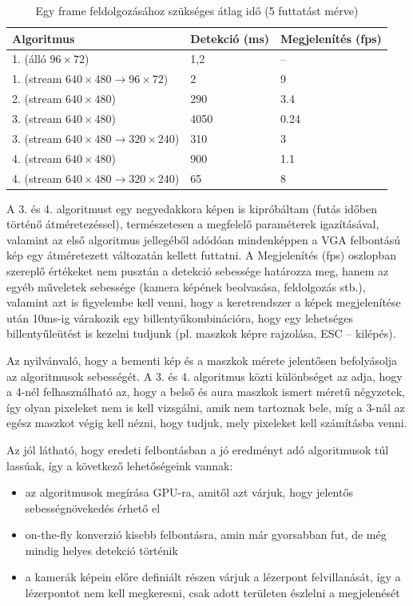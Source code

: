 \documentclass[a4paper,oneside]{article}
\begin{document}
\begin{table}[tbh]
  \centering

	\begin{tabular}{|l|l|l|}
	\hline 
	\textbf{Algoritmus} & \textbf{Detekció (ms)} & \textbf{Megjelenítés (fps)} \\ 
	\hline
	1. (álló $96\times 72$) & 1,2 & -- \\ \hline
	1. (stream $640\times 480 \rightarrow 96\times 72$) & 2 & 9 \\ \hline
	2. (stream $640\times 480$) & 290 & 3.4 \\ \hline
	3. (stream $640\times 480$) & 4050 & 0.24 \\ \hline
	3. (stream $640\times 480 \rightarrow 320\times 240$) & 310 & 3 \\ \hline
	4. (stream $640\times 480$) & 900 & 1.1 \\ \hline
	4. (stream $640\times 480 \rightarrow 320\times 240$) & 65 & 8 \\ \hline
	\end{tabular} 

  \caption{Egy frame feldolgozásához szükséges átlag idő (5 futtatást mérve) \label{tab:perf-table}}
\end{table}

A 3. és 4. algoritmust egy negyedakkora képen is kipróbáltam (futás időben történő átméretezéssel), természetesen a megfelelő paraméterek igazításával, valamint az első algoritmus jellegéből adódóan mindenképpen a VGA felbontású kép egy átméretezett változatán kellett futtatni. A Megjelenítés (fps) oszlopban szereplő értékeket nem pusztán a detekció sebessége határozza meg, hanem az egyéb műveletek sebessége (kamera képének beolvasása, feldolgozás stb.), valamint azt is figyelembe kell venni, hogy a keretrendszer a képek megjelenítése után 10ms-ig várakozik egy billentyűkombinációra, hogy egy lehetséges billentyűleütést is kezelni tudjunk (pl. maszkok képre rajzolása, ESC -- kilépés).

Az nyilvánvaló, hogy a bementi kép és a maszkok mérete jelentősen befolyásolja az algoritmusok sebességét. A 3. és 4. algoritmus közti különbséget az adja, hogy a 4-nél felhasználható az, hogy a belső és aura maszkok ismert méretű négyzetek, így olyan pixeleket nem is kell vizsgálni, amik nem tartoznak bele, míg a 3-nál az egész maszkot végig kell nézni, hogy tudjuk, mely pixeleket kell számításba venni.

Az jól látható, hogy eredeti felbontásban a jó eredményt adó algoritmusok túl lassúak, így a következő lehetőségeink vannak:
\begin{itemize}[itemsep=0pt]
\item az algoritmusok megírása GPU-ra, amitől azt várjuk, hogy jelentős sebességnövekedés érhető el
\item on-the-fly konverzió kisebb felbontásra, amin már gyorsabban fut, de még mindig helyes detekció történik
\item a kamerák képein előre definiált részen várjuk a lézerpont felvillanását, így a lézerpontot nem kell megkeresni, csak adott területen észlelni a megjelenését
\end{itemize}
\end{document}
